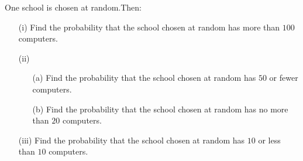 \documentclass{article}
\begin{document}
\begin{enumerate}
	\text One school is chosen at random.Then:
	\begin{enumerate}
		\item[(i) ] Find the probability that the school chosen at random has more than $100$ computers.
		\item[(ii)]
		\begin{enumerate}
			\item[(a)] Find the probability that the school chosen at random has $50$ or fewer computers.
			\item[(b)] Find the probability that the school chosen at random has no more than $20$ computers.
		\end{enumerate}
		\item[(iii)] Find the probability that the school chosen at random has $10$ or less than $10$ computers.
	\end{enumerate}


\end{enumerate}
\end{document}
